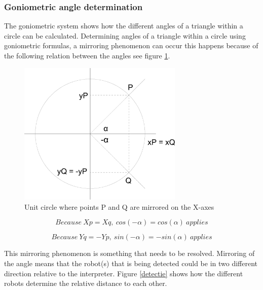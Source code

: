 \documentclass[10pt,a4paper]{article}
\begin{document}
\subsubsection{Goniometric angle determination}
The goniometric system shows how the different angles of a triangle within a circle can be calculated. Determining angles of a triangle within a circle using goniometric formulas, a mirroring phenomenon can occur this happens because of the following relation between the angles see figure \ref{circle}.

\begin{figure}[H]
\centering
\includegraphics[width=0.7\textwidth]{Cirkel.pdf}
\caption{Unit circle where points P and Q are mirrored on the X-axes}
\label{circle}
\end{figure}

\begin{equation}
Because\ Xp = Xq,\ cos(-\alpha) = cos(\alpha)\ applies
\end{equation}

\begin{equation}
Because\ Yq = -Yp,\ sin(-\alpha) = -sin(\alpha)\ applies
\end{equation}

This mirroring phenomenon is something that needs to be resolved. Mirroring of the angle means that the robot(s) that is being detected could be in two different direction relative to the interpreter. Figure \ref{detectie} shows how the different robots determine the relative distance to each other. 

\end{document}
